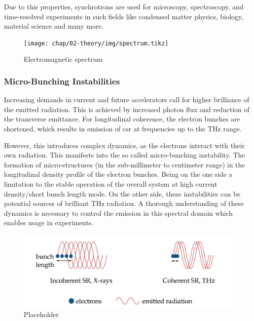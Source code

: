 Due to this properties, synchrotrons are used for microscopy, spectroscopy, and time-resolved experiments in such fields like condensed matter physics, biology, material science and many more.
\begin{figure}[H]
	\centering
	\texttt{[image: chap/02-theory/img/spectrum.tikz]}
	\caption{Electromagnetic spectrum} %
	\label{fig:spectrum}
\end{figure}

\subsubsection{Micro-Bunching Instabilities}
Increasing demands in current and future accelerators call for higher brilliance of the emitted radiation.
This is achieved by increased photon flux and reduction of the transverse emittance.
For longitudinal coherence, the electron bunches are shortened, which results in emission of \gls{csr} at frequencies up to the THz range.

However, this introduces complex dynamics, as the electrons interact with their own radiation.
This manifests into the so called micro-bunching instability.
The formation of micro-structures (in the sub-millimeter to centimeter range) in the longitudinal density profile of the electron bunches.
Being on the one side a limitation to the stable operation of the overall system at high current density/short bunch length mode.
On the other side, these instabilities can be potential sources of brilliant THz radiation. %
A thorough understanding of these dynamics is necessary to control the emission in this spectral domain which enables usage in experiments. \cite{rota2018,brosi}

\begin{figure}[tbh]
	\centering
	\includegraphics[width = \textwidth]{chap/02-theory/img/csr2.png}
	\caption{Placeholder \cite{rota2018}}
	\label{fig:csr}
\end{figure}

